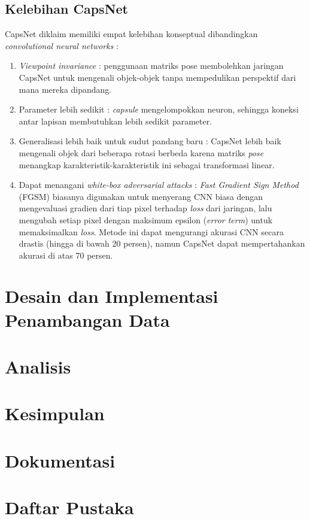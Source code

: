 \documentclass{article}
\begin{document}
   	\subsection{Kelebihan CapsNet}
   	CapsNet diklaim memiliki empat kelebihan konseptual dibandingkan \textit{convolutional neural networks} :
   	
   	\begin{enumerate}
   	 \item \textit{Viewpoint invariance} : penggunaan matriks pose membolehkan jaringan CapsNet untuk mengenali objek-objek tanpa mempedulikan perspektif dari mana mereka dipandang.
   	 \item Parameter lebih sedikit : \textit{capsule} mengelompokkan neuron, sehingga koneksi antar lapisan membutuhkan lebih sedikit parameter.
   	 \item Generalisasi lebih baik untuk sudut pandang baru : CapsNet lebih baik mengenali objek dari beberapa rotasi berbeda karena matriks \textit{pose} menangkap karakteristik-karakteristik ini sebagai transformasi linear.
   	 \item Dapat menangani \textit{white-box adversarial attacks} : \textit{Fast Gradient Sign Method} (FGSM) biasanya digunakan untuk menyerang CNN biasa dengan mengevaluasi gradien dari tiap pixel terhadap \textit{loss} dari jaringan, lalu mengubah setiap pixel dengan maksimum epsilon (\textit{error term}) untuk memaksimalkan \textit{loss}. Metode ini dapat mengurangi akurasi CNN secara drastis (hingga di bawah 20 persen), namun CapsNet dapat mempertahankan akurasi di atas 70 persen. 
   	\end{enumerate}
   	
   \section{Desain dan Implementasi Penambangan Data}
   \section{Analisis}
   \section{Kesimpulan}
   \section{Dokumentasi}
   \section{Daftar Pustaka}
   
\end{document}

